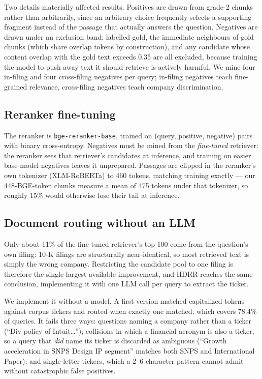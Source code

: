 \documentclass[conference]{IEEEtran}
\begin{document}
Two details materially affected results. Positives are drawn from grade-2
chunks rather than arbitrarily, since an arbitrary choice frequently selects a
supporting fragment instead of the passage that actually answers the question.
Negatives are drawn under an exclusion band: labelled gold, the immediate
neighbours of gold chunks (which share overlap tokens by construction), and any
candidate whose content overlap with the gold text exceeds 0.35 are all
excluded, because training the model to push away text it should retrieve is
actively harmful. We mine four in-filing and four cross-filing negatives per
query; in-filing negatives teach fine-grained relevance, cross-filing negatives
teach company discrimination.

\subsection{Reranker fine-tuning}
The reranker is \texttt{bge-reranker-base}, trained on (query, positive,
negative) pairs with binary cross-entropy. Negatives must be mined from the
\emph{fine-tuned} retriever: the reranker sees that retriever's candidates at
inference, and training on easier base-model negatives leaves it unprepared.
Passages are clipped in the reranker's own tokenizer (XLM-RoBERTa) to 460
tokens, matching training exactly --- our 448-BGE-token chunks measure a mean
of 475 tokens under that tokenizer, so roughly 15\% would otherwise lose their
tail at inference.

\subsection{Document routing without an LLM}
\label{sec:routing}
Only about 11\% of the fine-tuned retriever's top-100 come from the question's
own filing: 10-K filings are structurally near-identical, so most retrieved
text is simply the wrong company. Restricting the candidate pool to one filing
is therefore the single largest available improvement, and HDRR reaches the
same conclusion, implementing it with one LLM call per query to extract the
ticker.

We implement it without a model. A first version matched capitalized tokens
against corpus tickers and routed when exactly one matched, which covers 78.4\%
of queries. It fails three ways: questions naming a company rather than a
ticker (``Div policy of Intuit\ldots''); collisions in which a financial
acronym is also a ticker, so a query that \emph{did} name its ticker is
discarded as ambiguous (``Growth acceleration in SNPS Design IP segment''
matches both SNPS and International Paper); and single-letter tickers, which a
2--6 character pattern cannot admit without catastrophic false positives.
\end{document}
